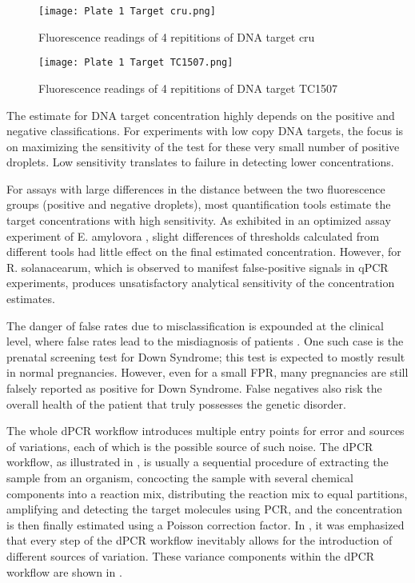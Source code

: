 \begin{figure}[h]
    \centering
    \texttt{[image: Plate 1 Target cru.png]}
    \caption{Fluorescence readings of 4 repititions of DNA target cru}
        \label{fig:plate1cru}
\end{figure}

\begin{figure}[h]
    \centering
    \texttt{[image: Plate 1 Target TC1507.png]}
    \caption{Fluorescence readings of 4 repititions of DNA target TC1507}
        \label{fig:plate1tc1507}
\end{figure}

The estimate for DNA target concentration highly depends on the positive and negative classifications. For experiments with low copy DNA targets, the focus is on maximizing the sensitivity of the test for these very small number of positive droplets. Low sensitivity translates to failure in detecting lower concentrations. 

For assays with large differences in the distance between the two fluorescence groups (positive and negative droplets), most quantification tools estimate the target concentrations with high sensitivity. As exhibited in an optimized assay experiment of E. amylovora \cite{Dreo2014}, slight differences of thresholds calculated from different tools had little effect on the final estimated concentration. However, for R. solanacearum, which is observed to manifest false-positive signals in qPCR experiments, produces unsatisfactory analytical sensitivity of the concentration estimates. 

The danger of false rates due to misclassification is expounded at the clinical level, where false rates lead to the misdiagnosis of patients \cite{Tzonev2018}. One such case is the prenatal screening test for Down Syndrome; this test is expected to mostly result in normal pregnancies. However, even for a small FPR, many pregnancies are still falsely reported as positive for Down Syndrome. False negatives also risk the overall health of the patient that truly possesses the genetic disorder.

The whole dPCR workflow introduces multiple entry points for error and sources of variations, each of which is the possible source of such noise. The dPCR workflow, as illustrated in , is usually a sequential procedure of extracting the sample from an organism, concocting the sample with several chemical components into a reaction mix, distributing the reaction mix to equal partitions, amplifying and detecting the target molecules using PCR, and the concentration is then finally estimated using a Poisson correction factor. In \cite{Jacobs2014}, it was emphasized that every step of the dPCR workflow inevitably allows for the introduction of different sources of variation. These variance components within the dPCR workflow are shown in . 

